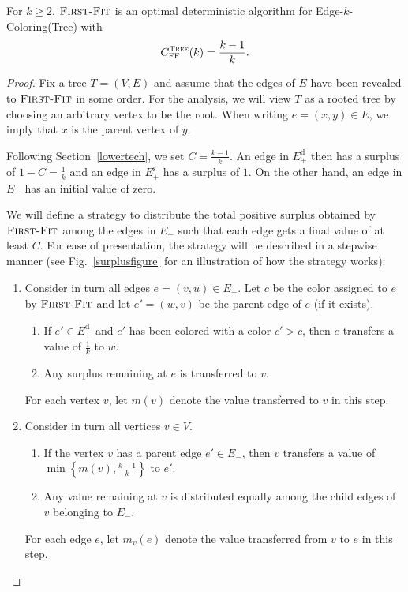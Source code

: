 \documentclass[smallextended]{svjour3}
\def\mctree{{\sc Edge-$k$-Coloring(Tree)}\xspace}
\newcommand{\ec}{\ensuremath{E_{+}}\xspace}
\newcommand{\ed}{\ensuremath{E_{+}^{\text{d}}}\xspace}
\newcommand{\er}{\ensuremath{E_{-}}\xspace}
\newcommand{\es}{\ensuremath{E_{+}^{\text{s}}}\xspace}
\newcommand{\FF}{\ensuremath{\operatorname{\textsc{First-Fit}}}\xspace}
\DeclareMathOperator{\FFm}{FF}
\begin{document}
\begin{theorem}
\label{fftree}
For $k\geq 2$, \FF is an optimal deterministic algorithm for \mctree with
$$C_{\FFm}^{\text{\sc Tree}}(k)=\frac{k-1}{k}.$$
\end{theorem}
\def\cmis{\widehat{c}_x}
\def\cmisv{\widehat{c}_v}

\begin{proof}
Fix a tree $T=(V,E)$ and assume that the edges of $E$ have been revealed to \FF in some order. For the analysis, we will view $T$ as a rooted tree by choosing an arbitrary vertex to be the root. When writing $e=(x,y)\in E$, we imply that $x$ is the parent vertex of $y$. 

Following Section~\ref{lowertech}, we set $C=\frac{k-1}{k}$. An edge in $\ed$ then has a surplus of $1-C=\frac{1}{k}$ and an edge in $\es$ has a surplus of $1$. On the other hand, an edge in $\er$ has an initial value of zero. 

We will define a strategy to distribute the total positive surplus obtained by \FF among the edges in $\er$ such that each edge gets a final value of at least $C$. For ease of presentation, the strategy will be described in a stepwise manner (see Fig.~\ref{surplusfigure} for an illustration of how the strategy works):

\begin{enumerate}[Step 1:]
\item  Consider in turn all edges $e=(v,u)\in\ec$. Let $c$ be the color assigned to $e$ by \FF and let $e'=(w,v)$ be the parent edge of $e$ (if it exists). 
  \begin{enumerate}
  \item If $e'\in \ed$ and $e'$ has been colored with a color $c'>c$,
    then $e$ transfers a value of $\frac1k$ to $w$.
  \item Any surplus remaining at $e$ is
    transferred to $v$.
  \end{enumerate}
  For each vertex $v$, let $m(v)$ denote the value transferred
   to $v$ in this step.
\item Consider in turn all vertices $v\in V$. 
  \begin{enumerate}
  \item If the vertex $v$ has a parent edge $e'\in\er$, then $v$ transfers a
    value of $\min\left\{m(v), \frac{k-1}{k}\right\}$ to $e'$. 
  \item Any value remaining at $v$ is distributed equally among the
    child edges of $v$ belonging to $\er$.
  \end{enumerate}
  For each edge $e$, let $m_v(e)$ denote the value transferred from $v$ to $e$ in this step.
\end{enumerate}


\end{proof}
\end{document}
